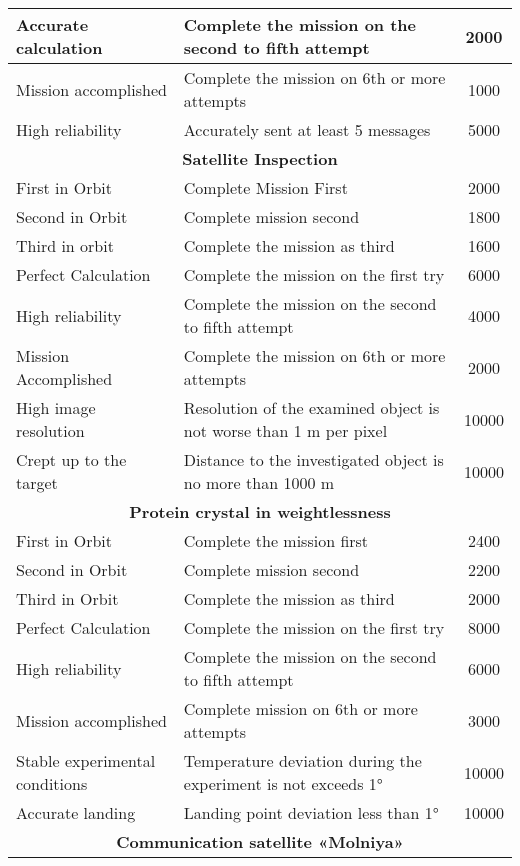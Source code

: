 \documentclass[12pt,a4paper]{article}
\begin{document}
\begin{center}
\begin{longtable}{ |p{5cm}|p{8cm}|c|}
   \hline
   Accurate calculation & Complete the mission on the second to fifth attempt & 2000\\
   \hline
   Mission accomplished & Complete the mission on 6th or more attempts & 1000\\
   \hline
   High reliability & Accurately sent at least 5 messages & 5000\\
   \hline
   \multicolumn{3}{|c|}{\textbf{Satellite Inspection}}\\
   \hline
   First in Orbit & Complete Mission First & 2000\\
   \hline
   Second in Orbit & Complete mission second & 1800\\
   \hline
   Third in orbit & Complete the mission as third & 1600\\
   \hline
   Perfect Calculation & Complete the mission on the first try & 6000\\
   \hline
   High reliability & Complete the mission on the second to fifth attempt & 4000\\
   \hline
   Mission Accomplished & Complete the mission on 6th or more attempts & 2000\\
   \hline
   High image resolution & Resolution of the examined object is not worse than 1 m per pixel & 10000\\
   \hline
   Crept up to the target & Distance to the investigated object is no more than 1000 m & 10000\\
  \hline
\multicolumn{3}{|c|}{\textbf{Protein crystal in weightlessness}}\\
   \hline
   First in Orbit & Complete the mission first & 2400\\
   \hline
   Second in Orbit & Complete mission second & 2200\\
   \hline
   Third in Orbit & Complete the mission as third & 2000\\
   \hline
   Perfect Calculation & Complete the mission on the first try & 8000\\
   \hline
   High reliability & Complete the mission on the second to fifth attempt & 6000\\
   \hline
   Mission accomplished & Complete mission on 6th or more attempts & 3000\\
   \hline
   Stable experimental conditions & Temperature deviation during the experiment is not
   exceeds 1° & 10000\\
   \hline
   Accurate landing & Landing point deviation less than 1° & 10000\\
   \hline
    \multicolumn{3}{|c|}{\textbf{Communication satellite «Molniya»}}\\

\end{longtable}
\end{center}
\end{document}
